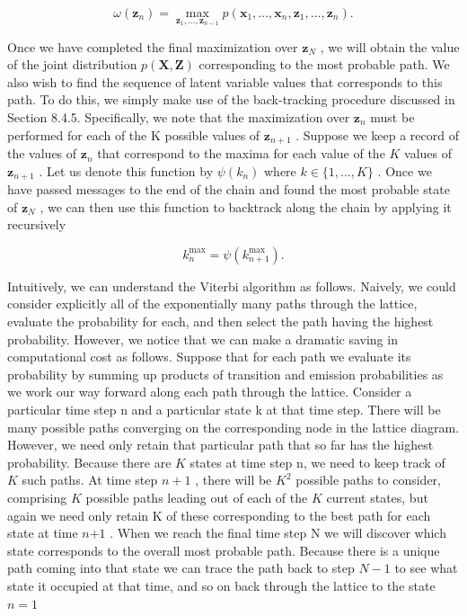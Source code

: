 \documentclass[
  10
]{article}
\begin{document}
\[
\omega (\mathbf {z} _ {n}) = \max _ {\mathbf {z} _ {1}, \ldots , \mathbf {z} _ {n - 1}} p (\mathbf {x} _ {1}, \ldots , \mathbf {x} _ {n}, \mathbf {z} _ {1}, \ldots , \mathbf {z} _ {n}).\tag{13.70}
\]

Once we have completed the final maximization over
\(\mathbf { z } _ { N }\) , we will obtain the value of the joint
distribution \(p ( \mathbf { X } , \mathbf { Z } )\) corresponding to
the most probable path. We also wish to find the sequence of latent
variable values that corresponds to this path. To do this, we simply
make use of the back-tracking procedure discussed in Section 8.4.5.
Specifically, we note that the maximization over
\(\mathbf { z } _ { n }\) must be performed for each of the K possible
values of \(\mathbf { z } _ { n + 1 }\) . Suppose we keep a record of
the values of \(\mathbf { z } _ { n }\) that correspond to the maxima
for each value of the \(K\) values of \(\mathbf { z } _ { n + 1 }\) .
Let us denote this function by \(\psi ( k _ { n } )\) where
\(k \in \{ 1 , \ldots , K \}\) . Once we have passed messages to the end
of the chain and found the most probable state of
\(\mathbf { z } _ { N }\) , we can then use this function to backtrack
along the chain by applying it recursively

\[
k _ {n} ^ {\mathrm{max}} = \psi (k _ {n + 1} ^ {\mathrm{max}}).\tag{13.71}
\]

Intuitively, we can understand the Viterbi algorithm as follows.
Naively, we could consider explicitly all of the exponentially many
paths through the lattice, evaluate the probability for each, and then
select the path having the highest probability. However, we notice that
we can make a dramatic saving in computational cost as follows. Suppose
that for each path we evaluate its probability by summing up products of
transition and emission probabilities as we work our way forward along
each path through the lattice. Consider a particular time step n and a
particular state k at that time step. There will be many possible paths
converging on the corresponding node in the lattice diagram. However, we
need only retain that particular path that so far has the highest
probability. Because there are \(K\) states at time step n, we need to
keep track of \(K\) such paths. At time step \(n + 1\) , there will be
\(K ^ { 2 }\) possible paths to consider, comprising \(K\) possible
paths leading out of each of the \(K\) current states, but again we need
only retain K of these corresponding to the best path for each state at
time \(n { + 1 }\) . When we reach the final time step N we will
discover which state corresponds to the overall most probable path.
Because there is a unique path coming into that state we can trace the
path back to step \(N - 1\) to see what state it occupied at that time,
and so on back through the lattice to the state \(n = 1\)
\end{document}
